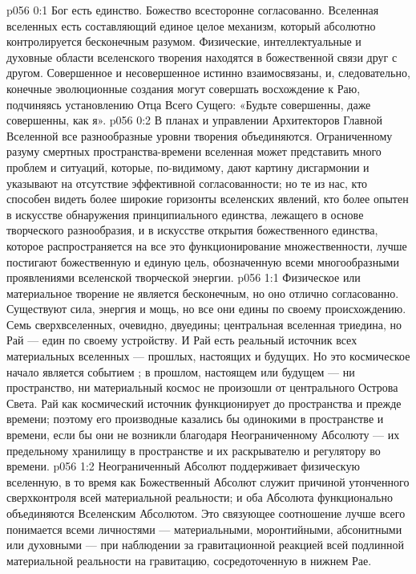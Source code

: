 \author{Могучий Вестник и Махивента Мелхиседек}
\vs p056 0:1 Бог есть единство. Божество всесторонне согласованно. Вселенная вселенных есть составляющий единое целое механизм, который абсолютно контролируется бесконечным разумом. Физические, интеллектуальные и духовные области вселенского творения находятся в божественной связи друг с другом. Совершенное и несовершенное истинно взаимосвязаны, и, следовательно, конечные эволюционные создания могут совершать восхождение к Раю, подчиняясь установлению Отца Всего Сущего: «Будьте совершенны, даже совершенны, как я».
\vs p056 0:2 В планах и управлении Архитекторов Главной Вселенной все разнообразные уровни творения объединяются. Ограниченному разуму смертных пространства\hyp{}времени вселенная может представить много проблем и ситуаций, которые, по\hyp{}видимому, дают картину дисгармонии и указывают на отсутствие эффективной согласованности; но те из нас, кто способен видеть более широкие горизонты вселенских явлений, кто более опытен в искусстве обнаружения принципиального единства, лежащего в основе творческого разнообразия, и в искусстве открытия божественного единства, которое распространяется на все это функционирование множественности, лучше постигают божественную и единую цель, обозначенную всеми многообразными проявлениями вселенской творческой энергии.
\vs p056 1:1 Физическое или материальное творение не является бесконечным, но оно отлично согласованно. Существуют сила, энергия и мощь, но все они едины по своему происхождению. Семь сверхвселенных, очевидно, двуедины; центральная вселенная триедина, но Рай --- един по своему устройству. И Рай есть реальный источник всех материальных вселенных --- прошлых, настоящих и будущих. Но это космическое начало является событием ;  в прошлом, настоящем или будущем --- ни пространство, ни материальный космос не произошли от центрального Острова Света. Рай как космический источник функционирует до пространства и прежде времени; поэтому его производные казались бы одинокими в пространстве и времени, если бы они не возникли благодаря Неограниченному Абсолюту --- их предельному хранилищу в пространстве и их раскрывателю и регулятору во времени.
\vs p056 1:2 \pc Неограниченный Абсолют поддерживает физическую вселенную, в то время как Божественный Абсолют служит причиной утонченного сверхконтроля всей материальной реальности; и оба Абсолюта функционально объединяются Вселенским Абсолютом. Это связующее соотношение лучше всего понимается всеми личностями --- материальными, моронтийными, абсонитными или духовными --- при наблюдении за гравитационной реакцией всей подлинной материальной реальности на гравитацию, сосредоточенную в нижнем Рае.
